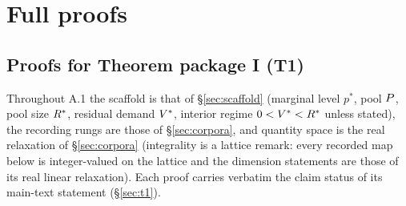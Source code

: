 \section{Full proofs}
\label{app:proofs}

\subsection{Proofs for Theorem package I (T1)}
\label{app:proofs-t1}

\label{app:t1proofs}
Throughout A.1 the scaffold is that of \S\ref{sec:scaffold} (marginal level
$p^{*}$, pool $P$, pool size $R^{*}$, residual demand $V^{*}$,
interior regime $0 < V^{*} < R^{*}$ unless stated), the recording rungs
are those of \S\ref{sec:corpora}, and quantity space is the real relaxation
of \S\ref{sec:corpora} (integrality is a lattice remark: every recorded map
below is integer-valued on the lattice and the dimension statements are
those of its real linear relaxation). Each proof carries verbatim the claim
status of its main-text statement (\S\ref{sec:t1}).

